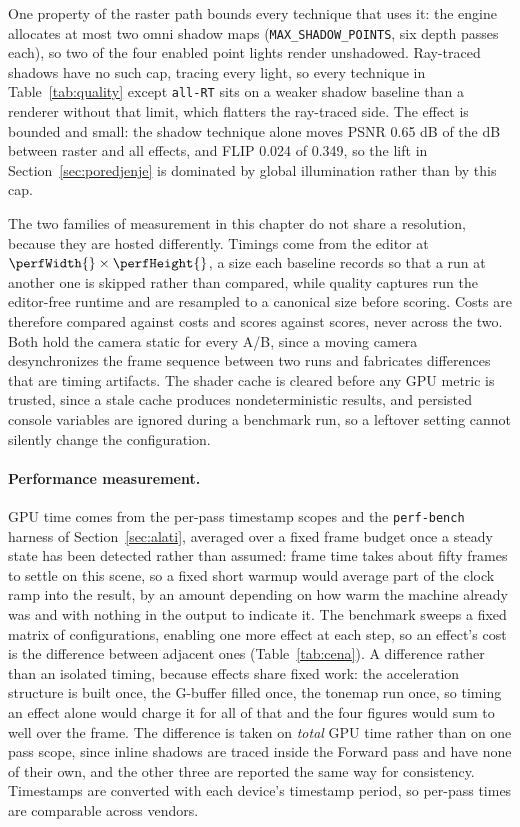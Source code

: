 One property of the raster path bounds every technique that uses it: the engine allocates at most two
omni shadow maps (\texttt{MAX\_SHADOW\_POINTS}, six depth passes each), so two of the four enabled
point lights render unshadowed. Ray-traced shadows have no such cap, tracing every light, so
every technique in Table~\ref{tab:quality} except \texttt{all-RT} sits on a weaker shadow baseline
than a renderer without that limit, which flatters the ray-traced side. The effect is bounded and
small: the shadow technique alone moves PSNR 0.65 dB of the \qRtLiftPsnr{} dB between raster and all effects,
and FLIP 0.024 of 0.349, so the lift in Section~\ref{sec:poredjenje} is dominated by global
illumination rather than by this cap.

The two families of measurement in this chapter do not share a resolution, because they are hosted
differently. Timings come from the editor at $\perfWidth{} \times \perfHeight{}$, a size each baseline records so that
a run at another one is skipped rather than compared, while quality captures run the editor-free
runtime and are resampled to a canonical size before scoring. Costs are therefore compared against
costs and scores against scores, never across the two. Both hold the camera static for every A/B,
since a moving camera desynchronizes the frame sequence between two runs and fabricates differences
that are timing artifacts. The shader cache is cleared before any GPU metric is trusted, since a
stale cache produces nondeterministic results, and persisted console variables are ignored during a
benchmark run, so a leftover setting cannot silently change the configuration.

\paragraph{Performance measurement.} GPU time comes from the per-pass timestamp scopes and the
\texttt{perf-bench} harness of Section~\ref{sec:alati}, averaged over a fixed frame budget once a
steady state has been detected rather than assumed: frame time takes about fifty frames to settle on
this scene, so a fixed short warmup would average part of the clock ramp into the result, by an
amount depending on how warm the machine already was and with nothing in the output to indicate it.
The benchmark sweeps a fixed matrix of configurations, enabling one more effect at each step, so an
effect's cost is the difference between adjacent ones (Table~\ref{tab:cena}). A difference rather
than an isolated timing, because effects share fixed work: the acceleration structure is built once,
the G-buffer filled once, the tonemap run once, so timing an effect alone would charge it for all of
that and the four figures would sum to well over the frame. The difference is taken on \emph{total}
GPU time rather than on one pass scope, since inline shadows are traced inside the Forward pass and
have none of their own, and the other three are reported the same way for consistency. Timestamps are
converted with each device's timestamp period, so per-pass times are comparable across vendors.

